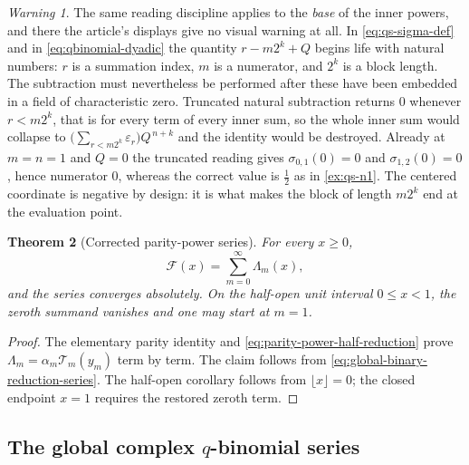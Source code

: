 \documentclass[11pt,oneside]{article}
\newtheorem{theorem}{Theorem}[section]
\theoremstyle{definition}
\theoremstyle{remark}
\newtheorem{warning}[theorem]{Warning}
\begin{document}
\begin{warning}
\label{warn:blu-natural-subtraction}
The same reading discipline applies to the \emph{base} of the inner powers, and there the
article's displays give no visual warning at all.  In
\eqref{eq:qs-sigma-def} and in \eqref{eq:qbinomial-dyadic} the quantity $r-m2^k+Q$ begins
life with natural numbers: $r$ is a summation index, $m$ is a numerator, and $2^k$ is a
block length.  The subtraction must nevertheless be performed after these have been embedded
in a field of characteristic zero.  Truncated natural subtraction returns $0$ whenever
$r<m2^k$, that is for every term of every inner sum, so the whole inner sum would collapse
to $\bigl(\sum_{r<m2^k}\varepsilon_r\bigr)Q^{\,n+k}$ and the identity would be destroyed.
Already at $m=n=1$ and $Q=0$ the truncated reading gives $\sigma_{0,1}(0)=0$ and
$\sigma_{1,2}(0)=0$, hence numerator $0$, whereas the correct value is $\tfrac12$ as in
\cref{ex:qs-n1}.  The centered coordinate is negative by design: it is what makes the block
of length $m2^k$ end at the evaluation point.
\end{warning}

\begin{theorem}[Corrected parity-power series]
For every $x\ge0$,
\begin{equation}
 \boxed{\mathcal F(x)=\sum_{m=0}^{\infty}\Lambda_m(x),}  \label{eq:corrected-parity-power-series}
\end{equation}
and the series converges absolutely.  On the half-open unit interval $0\le x<1$, the
zeroth summand vanishes and one may start at $m=1$.
\end{theorem}

\begin{proof}
The elementary parity identity and \eqref{eq:parity-power-half-reduction} prove
$\Lambda_m=\alpha_m\mathcal T_m(y_m)$ term by term.  The claim follows from
\eqref{eq:global-binary-reduction-series}.  The half-open corollary follows from
$\lfloor x\rfloor=0$; the closed endpoint $x=1$ requires the restored zeroth term.
\end{proof}

\subsection{The global complex $q$-binomial series}
\label{subsec:global-q-series}
\end{document}
